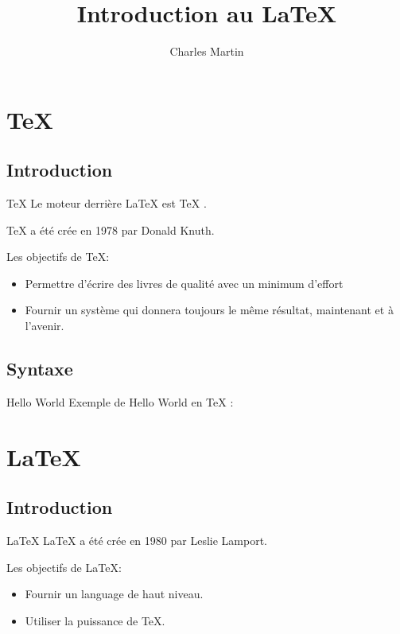 \documentclass{beamer}
\title{Introduction au \LaTeX}
\author{Charles Martin}
\begin{document}



\section{\TeX}	
\subsection{Introduction}
\begin{frame}{\TeX}
  Le moteur derrière \LaTeX{} est \TeX{} .
  
  
  \TeX{} a été crée en 1978 par Donald Knuth.
  \begin{block}{Les objectifs de \TeX :}    
   \begin{itemize}
    \item Permettre d’écrire des livres de qualité avec un minimum d’effort
    \item Fournir un système qui donnera toujours le même résultat, maintenant et à l’avenir.
   \end{itemize}
  \end{block}
\end{frame}

\subsection{Syntaxe}
\begin{frame}{Hello World}
	Exemple de Hello World en \TeX{} :
    
\end{frame}

\section{\LaTeX}
\subsection{Introduction}
\begin{frame}{\LaTeX}
  \LaTeX{} a été crée en 1980 par Leslie Lamport.
  \begin{block}{Les objectifs de \LaTeX :}    
   \begin{itemize}
    \item Fournir un language de haut niveau.
    \item Utiliser la puissance de \TeX{}.
   \end{itemize}
  \end{block}
\end{frame}
\end{document}
